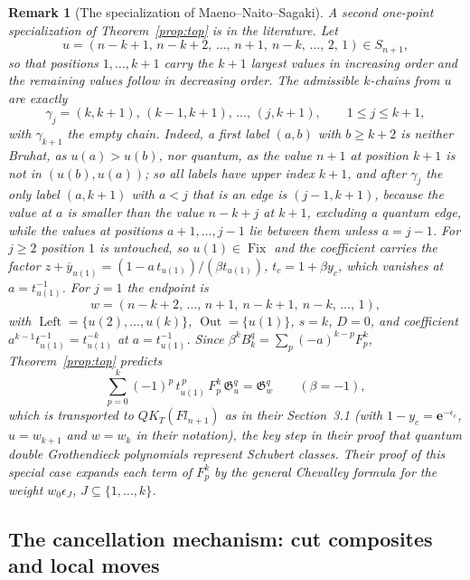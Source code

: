 \documentclass[11pt]{article}
\newtheorem{remark}[proposition]{Remark}
\newcommand{\G}{\mathfrak{G}}
\newcommand{\Fix}{\operatorname{Fix}}
\newcommand{\Left}{\operatorname{Left}}
\newcommand{\Out}{\operatorname{Out}}
\begin{document}
\begin{remark}[The specialization of Maeno--Naito--Sagaki]
A second one-point specialization of Theorem~\ref{prop:top} is in the
literature. Let
\[
 u=(n{-}k{+}1,\,n{-}k{+}2,\,\ldots,\,n{+}1,\ n{-}k,\,\ldots,\,2,\,1)\in S_{n+1},
\]
so that positions $1,\ldots,k+1$ carry the $k+1$ largest values in
increasing order and the remaining values follow in decreasing order.
The admissible $k$-chains from $u$ are exactly
\[
 \gamma_j=(k,k{+}1),\,(k{-}1,k{+}1),\,\ldots,\,(j,k{+}1),
 \qquad 1\leq j\leq k+1,
\]
with $\gamma_{k+1}$ the empty chain. Indeed, a first label $(a,b)$
with $b\geq k+2$ is neither Bruhat, as $u(a)>u(b)$, nor quantum, as
the value $n+1$ at position $k+1$ is not in $(u(b),u(a))$; so all
labels have upper index $k+1$, and after
$\gamma_j$ the only label $(a,k+1)$ with $a<j$ that is an edge is
$(j{-}1,k{+}1)$, because the value at $a$ is smaller than the value
$n-k+j$ at $k+1$, excluding a quantum edge, while the values at
positions $a+1,\ldots,j-1$ lie between them unless $a=j-1$. For $j\geq2$
position $1$ is untouched, so $u(1)\in\Fix$ and the coefficient
carries the factor $z+\overline y_{u(1)}=(1-a\,t_{u(1)})/(\beta t_{u(1)})$,
$t_c=1+\beta y_c$, which vanishes at $a=t_{u(1)}^{-1}$. For $j=1$ the
endpoint is
\[
 w=(n{-}k{+}2,\,\ldots,\,n{+}1,\ n{-}k{+}1,\ n{-}k,\,\ldots,\,1),
\]
with $\Left=\{u(2),\ldots,u(k)\}$, $\Out=\{u(1)\}$, $s=k$, $D=0$, and
coefficient $a^{k-1}t_{u(1)}^{-1}=t_{u(1)}^{-k}$ at $a=t_{u(1)}^{-1}$.
Since $\beta^kB_k^q=\sum_p(-a)^{k-p}F^k_p$, Theorem~\ref{prop:top}
predicts
\[
 \sum_{p=0}^k(-1)^{p}\,t_{u(1)}^{\,p}\,F^k_p\,\G^q_u=\G^q_w
 \qquad(\beta=-1),
\]
which is \cite[Proposition~2.3]{maeno2024presentation2} transported to
$QK_T(Fl_{n+1})$ as in their Section~3.1 (with $1-y_c=\mathbf e^{-\epsilon_c}$,
$u=w_{k+1}$ and $w=w_k$ in their notation), the key step in their
proof that quantum double Grothendieck polynomials represent Schubert
classes. Their proof of this special case expands each term of
$F^k_p$ by the general Chevalley formula for the weight
$w_0\epsilon_J$, $J\subseteq\{1,\ldots,k\}$.
\end{remark}

\subsection{The cancellation mechanism: cut composites and local moves}
\label{sec:mechanism}
\end{document}
